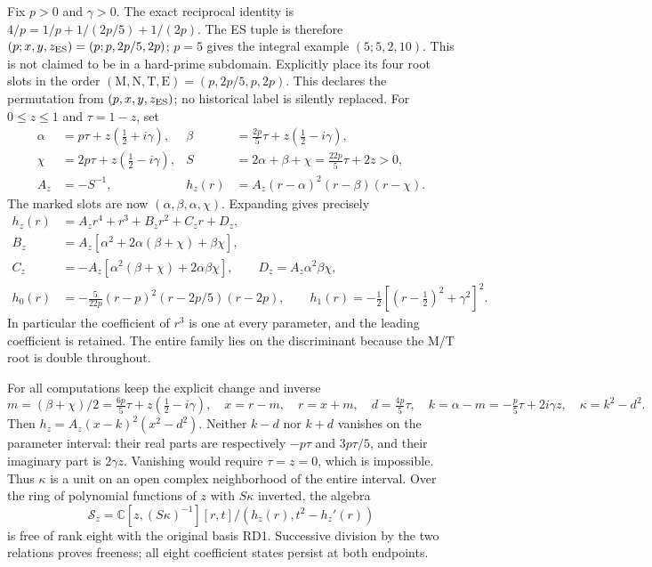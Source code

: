 \documentclass[11pt]{article}
\begin{document}
Fix $p>0$ and $\gamma>0$. The exact reciprocal identity is
$4/p=1/p+1/(2p/5)+1/(2p)$. The ES tuple is therefore
$(p;x,y,z_{\rm ES})=(p;p,2p/5,2p)$; $p=5$ gives the
integral example $(5;5,2,10)$. This is not claimed to be
in a hard-prime subdomain. Explicitly place its four
root slots in the order
$(\mathrm M,\mathrm N,\mathrm T,\mathrm E)=(p,2p/5,p,2p)$.
This declares the permutation from $(p,x,y,z_{\rm ES})$;
no historical label is silently replaced. For $0\le z\le1$
and $\tau=1-z$, set
\begin{equation}
\begin{aligned}
 \alpha&=p\tau+z(\tfrac12+i\gamma),&
 \beta&=\tfrac{2p}{5}\tau+z(\tfrac12-i\gamma),\\
 \chi&=2p\tau+z(\tfrac12-i\gamma),&
 S&=2\alpha+\beta+\chi=\tfrac{22p}{5}\tau+2z>0,\\
 A_z&=-S^{-1},&
 h_z(r)&=A_z(r-\alpha)^2(r-\beta)(r-\chi).
\end{aligned}\tag{EF1}
\end{equation}
The marked slots are now $(\alpha,\beta,\alpha,\chi)$.
Expanding gives precisely
\begin{equation}
\begin{aligned}
 h_z(r)&=A_zr^4+r^3+B_zr^2+C_zr+D_z,\\
 B_z&=A_z[\alpha^2+2\alpha(\beta+\chi)+\beta\chi],\\
 C_z&=-A_z[\alpha^2(\beta+\chi)+2\alpha\beta\chi],\qquad
 D_z=A_z\alpha^2\beta\chi,\\
 h_0(r)&=-\frac5{22p}(r-p)^2(r-2p/5)(r-2p),\qquad
 h_1(r)=-\tfrac12[(r-\tfrac12)^2+\gamma^2]^2.
\end{aligned}\tag{EF2}
\end{equation}
In particular the coefficient of $r^3$ is one at every
parameter, and the leading coefficient is retained.
The entire family lies on the discriminant because
the M/T root is double throughout.

For all computations keep the explicit change and inverse
\begin{equation}
 m=(\beta+\chi)/2=\tfrac{6p}{5}\tau+z(\tfrac12-i\gamma),\quad
 x=r-m,\quad r=x+m,\quad
 d=\tfrac{4p}{5}\tau,\quad k=\alpha-m=-\tfrac p5\tau+2i\gamma z,
 \quad\kappa=k^2-d^2.
 \tag{EF3}
\end{equation}
Then $h_z=A_z(x-k)^2(x^2-d^2)$. Neither $k-d$
nor $k+d$ vanishes on the parameter interval: their
real parts are respectively $-p\tau$ and $3p\tau/5$,
and their imaginary part is $2\gamma z$. Vanishing
would require $\tau=z=0$, which is impossible.
Thus $\kappa$ is a unit on an open complex neighborhood
of the entire interval. Over the ring of polynomial
functions of $z$ with $S\kappa$ inverted, the algebra
\begin{equation}
 \mathscr S_z=\mathbb C[z,(S\kappa)^{-1}][r,t]/
                  (h_z(r),t^2-h_z'(r))
 \tag{EF4}
\end{equation}
is free of rank eight with the original basis RD1.
Successive division by the two relations proves freeness;
all eight coefficient states persist at both endpoints.
\end{document}
